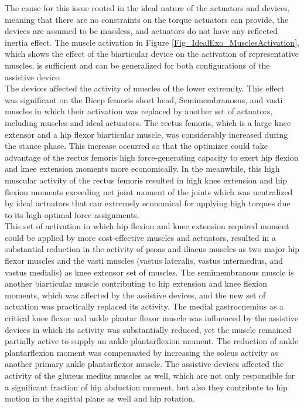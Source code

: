 \documentclass[10pt,letterpaper]{article}
\begin{document}
The cause for this issue rooted in the ideal nature of the actuators and devices, meaning that there are no constraints on the torque actuators can provide, the devices are assumed to be massless, and actuators do not have any reflected inertia effect. The muscle activation in Figure \ref{Fig_IdealExo_MusclesActivation}, which shows the effect of the biarticular device on the activation of representative muscles, is sufficient and can be generalized for both configurations of the assistive device. \\
The devices affected the activity of muscles of the lower extremity. This effect was significant on the Bicep femoris short head, Semimembranosus, and vasti muscles in which their activation was replaced by another set of actuators, including muscles and ideal actuators.  The rectus femoris, which is a large knee extensor and a hip flexor biarticular muscle, was considerably increased during the stance phase. This increase occurred so that the optimizer could take advantage of the rectus femoris high force-generating capacity to exert hip flexion and knee extension moments more economically. In the meanwhile, this high muscular activity of the rectus femoris resulted in high knee extension and hip flexion moments exceeding net joint moment of the joints which was neutralized by ideal actuators that can extremely economical for applying high torques due to its high optimal force assignments.\\
This set of activation in which hip flexion and knee extension required moment could be applied by more cost-effective muscles and actuators, resulted in a substantial reduction in the activity of psoas and iliacus muscles as two major hip flexor muscles and the vasti muscles (vastus lateralis, vastus intermedius, and vastus medialis) as knee extensor set of muscles. The semimembranous muscle is another biarticular muscle contributing to hip extension and knee flexion moments, which was affected by the assistive devices, and the new set of actuation was practically replaced its activity. The medial gastrocnemius as a critical knee flexor and ankle plantar flexor muscle was influenced by the assistive devices in which its activity was substantially reduced, yet the muscle remained partially active to supply an ankle plantarflexion moment. The reduction of ankle plantarflexion moment was compensated by increasing the soleus activity as another primary ankle plantarflexor muscle. The assistive devices affected the activity of the gluteus medius muscles as well, which are not only responsible for a significant fraction of hip abduction moment, but also they contribute to hip motion in the sagittal plane as well and hip rotation.\\
\end{document}
